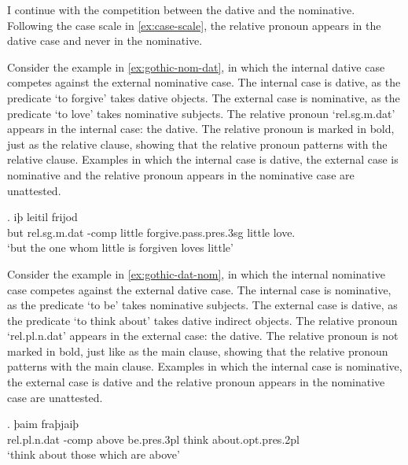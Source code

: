 I continue with the competition between the dative and the nominative. Following the case scale in \ref{ex:case-scale}, the relative pronoun appears in the dative case and never in the nominative.

Consider the example in \ref{ex:gothic-nom-dat}, in which the internal dative case competes against the external nominative case.
The internal case is dative, as the predicate  `to forgive' takes dative objects.
The external case is nominative, as the predicate  `to love' takes nominative subjects.
The relative pronoun  `\ac{rel}.\ac{sg}.\ac{m}.\ac{dat}' appears in the internal case: the dative. The relative pronoun is marked in bold, just as the relative clause, showing that the relative pronoun patterns with the relative clause.
Examples in which the internal case is dative, the external case is nominative and the relative pronoun appears in the nominative case are unattested.

\exg. iþ     leitil frijod\\
 but \ac{rel}.\ac{sg}.\ac{m}.\ac{dat} -\ac{comp} little {forgive}.\ac{pass}.\ac{pres}.3\ac{sg}\scsub{[dat]} little love.\scsub{[nom]}\\
 `but the one whom little is forgiven loves little' \label{ex:gothic-nom-dat}

Consider the example in \ref{ex:gothic-dat-nom}, in which the internal nominative case competes against the external dative case.
The internal case is nominative, as the predicate  `to be' takes nominative subjects.
The external case is dative, as the predicate  `to think about' takes dative indirect objects.
The relative pronoun  `\ac{rel}.\ac{pl}.\ac{n}.\ac{dat}' appears in the external case: the dative. The relative pronoun is not marked in bold, just like as the main clause, showing that the relative pronoun patterns with the main clause.
Examples in which the internal case is nominative, the external case is dative and the relative pronoun appears in the nominative case are unattested.

\exg. þaim    fraþjaiþ \\
 \ac{rel}.\ac{pl}.\ac{n}.\ac{dat} -\ac{comp} above be.\ac{pres}.3\ac{pl}\scsub{[nom]} {think about}.\ac{opt}.\ac{pres}.2\ac{pl}\scsub{[dat]}\\
 `think about those which are above' \label{ex:gothic-dat-nom}

